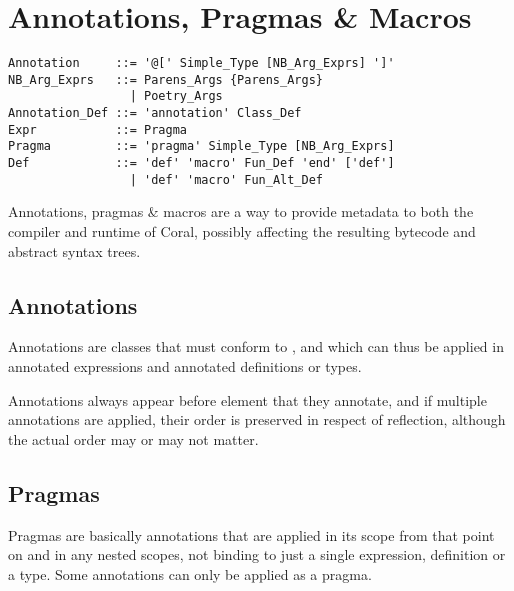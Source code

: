 
\chapter{Annotations, Pragmas \& Macros}
\label{sec:annotations}
\label{sec:pragmas}
\label{sec:macros}


\syntax\begin{lstlisting}
Annotation     ::= '@[' Simple_Type [NB_Arg_Exprs] ']'
NB_Arg_Exprs   ::= Parens_Args {Parens_Args}
                 | Poetry_Args
Annotation_Def ::= 'annotation' Class_Def
Expr           ::= Pragma
Pragma         ::= 'pragma' Simple_Type [NB_Arg_Exprs]
Def            ::= 'def' 'macro' Fun_Def 'end' ['def']
                 | 'def' 'macro' Fun_Alt_Def
\end{lstlisting}

Annotations, pragmas \& macros are a way to provide metadata to both the compiler and runtime of Coral, possibly affecting the resulting bytecode and abstract syntax trees. 





\section{Annotations}

Annotations are classes that must conform to , and which can thus be applied in annotated expressions and annotated definitions or types. 

Annotations always appear before element that they annotate, and if multiple annotations are applied, their order is preserved in respect of reflection, although the actual order may or may not matter. 






\section{Pragmas}
\label{sec:pragmas}

Pragmas are basically annotations that are applied in its scope from that point on and in any nested scopes, not binding to just a single expression, definition or a type. Some annotations can only be applied as a pragma. 






